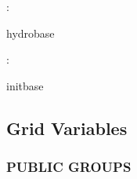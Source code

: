 : 

hydrobase
\vspace{2mm}

: 

initbase
\vspace{2mm}
\subsection*{Grid Variables}
\vspace{5mm}\subsubsection{PUBLIC GROUPS}

\vspace{5mm}

